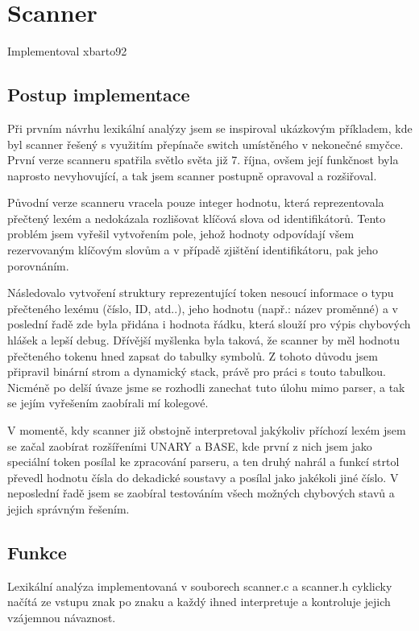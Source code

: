 \documentclass[11pt,a4paper]{article}
\begin{document}
\section{Scanner}
Implementoval xbarto92

	\subsection{Postup implementace}
	Při prvním návrhu lexikální analýzy jsem se inspiroval ukázkovým příkladem, kde byl scanner řešený s využitím přepínače switch umístěného v nekonečné smyčce. První verze scanneru spatřila světlo světa již 7. října, ovšem její funkčnost byla naprosto nevyhovující, a tak jsem scanner postupně opravoval a rozšiřoval.

	Původní verze scanneru vracela pouze integer hodnotu, která reprezentovala přečtený lexém a nedokázala rozlišovat klíčová slova od identifikátorů. Tento problém jsem vyřešil vytvořením pole, jehož hodnoty odpovídají všem rezervovaným klíčovým slovům a v případě zjištění identifikátoru, pak jeho porovnáním.

	Následovalo vytvoření struktury reprezentující token nesoucí informace o typu přečteného lexému (číslo, ID, atd..), jeho hodnotu (např.: název proměnné) a v poslední řadě zde byla přidána i hodnota řádku, která slouží pro výpis chybových hlášek a lepší debug. Dřívější myšlenka byla taková, že scanner by měl hodnotu přečteného tokenu hned zapsat do tabulky symbolů. Z tohoto důvodu jsem připravil binární strom a dynamický stack, právě pro práci s touto tabulkou. Nicméně po delší úvaze jsme se rozhodli zanechat tuto úlohu mimo parser, a tak se jejím vyřešením zaobírali mí kolegové.

	V momentě, kdy scanner již obstojně interpretoval jakýkoliv příchozí lexém jsem se začal zaobírat rozšířeními UNARY a BASE, kde první z nich jsem jako speciální token posílal ke zpracování parseru, a ten druhý nahrál a funkcí strtol převedl hodnotu čísla do dekadické soustavy a posílal jako jakékoli jiné číslo. V neposlední řadě jsem se zaobíral testováním všech možných chybových stavů a jejich správným řešením.

	\subsection{Funkce}
	Lexikální analýza implementovaná v souborech scanner.c a scanner.h cyklicky načítá ze vstupu znak po znaku a každý ihned interpretuje a kontroluje jejich vzájemnou návaznost.
\end{document}
